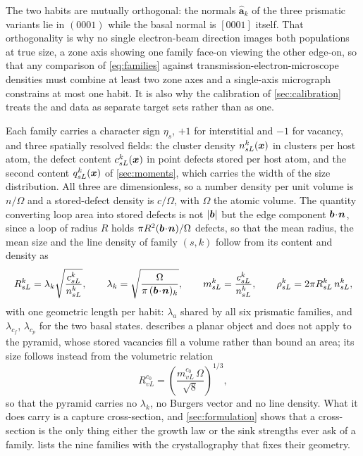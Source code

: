 The two habits are mutually orthogonal: the normals $\hat{\bm a}_k$ of the three
prismatic variants lie in $(0001)$ while the basal normal is $[0001]$ itself.
That orthogonality is why no single electron-beam direction images both
populations at true size, a zone axis showing one family face-on viewing the
other edge-on, so that any comparison of \cref{eq:families} against
transmission-electron-microscope densities must combine at least two zone axes
and a single-axis micrograph constrains at most one habit. It is also why the
calibration of \cref{sec:calibration} treats the \aloop{} and \cloop{} data as
separate target sets rather than as one.

Each family carries a character sign $\eta_s$, $+1$ for interstitial and $-1$ for
vacancy, and three spatially resolved fields: the cluster density $n^k_{sL}(\bm{x})$
in clusters per host atom, the defect content $c^k_{sL}(\bm{x})$ in point defects
stored per host atom, and the second content $q^k_{sL}(\bm{x})$ of
\cref{sec:moments}, which carries the width of the size distribution. All three
are dimensionless, so a number density per unit volume is $n/\Omega$ and a
stored-defect density is $c/\Omega$, with $\Omega$ the atomic volume. The
quantity converting loop area into stored defects is not $|\bm{b}|$ but the edge
component $\bm{b}\!\cdot\!\bm{n}$, since a loop of radius $R$ holds
$\pi R^{2}(\bm{b}\!\cdot\!\bm{n})/\Omega$ defects, so that the mean radius, the
mean size and the line density of family $(s,k)$ follow from its content and
density as
\begin{equation}
  R^k_{sL}=\lambda_k\sqrt{\frac{c^k_{sL}}{n^k_{sL}}},
  \qquad
  \lambda_k=\sqrt{\frac{\Omega}{\pi\,(\bm{b}\!\cdot\!\bm{n})_k}},
  \qquad
  m^k_{sL}=\frac{c^k_{sL}}{n^k_{sL}},
  \qquad
  \rho^k_{sL}=2\pi R^k_{sL}\,n^k_{sL},
  \label{eq:radius}
\end{equation}
with one geometric length per habit: $\lambda_a$ shared by all six prismatic
families, and $\lambda_{c_f}$, $\lambda_{c_p}$ for the two basal states.
 describes a planar object and does not apply to the pyramid,
whose stored vacancies fill a volume rather than bound an area; its size follows
instead from the volumetric relation
\begin{equation}
  R^{c_0}_{vL}=\left(\frac{m^{c_0}_{vL}\,\Omega}{\sqrt8}\right)^{1/3},
  \label{eq:Rsfp}
\end{equation}
so that the pyramid carries no $\lambda_k$, no Burgers vector and no line
density. What it does carry is a capture cross-section, and \cref{sec:formulation}
shows that a cross-section is the only thing either the growth law or the sink
strengths ever ask of a family.  lists the nine families
with the crystallography that fixes their geometry.

